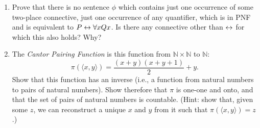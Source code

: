 {\begin{enumerate}
\begin{enumerate}
		\item Show that $\forall \upsilon \phi \wedge \forall \upsilon \psi \equiv \forall \upsilon \phi \wedge \forall \nu \psi[\nu/\upsilon]$ (and similarly for disjunction, and other combinations of universal and existential quantifiers).
		\item Show that for any elementary quantification $\phi'$ we can construct a logically equivalent sentence $\phi''$ in which any quantifier in $\phi'$ is brought to the front and has scope over the others. (Tip: remember to use the result proved in 12.(b).)
		\item Show, using these results, that there is a $\forall\exists$ sentence equivalent to any such monadic $\phi$.
	\end{enumerate}
\item Prove that there is no sentence $\phi$ which contains just one occurrence of some two-place connective, just one occurrence of any quantifier, which is in PNF and is equivalent to $P \leftrightarrow \forall x Qx$. Is there any connective other than $\leftrightarrow$ for which this also holds? Why?
\item The \emph{Cantor Pairing Function} is this function from $\mathbb{N}\times \mathbb{N}$ to $\mathbb{N}$: \begin{equation*}
	\pi(\langle x,y\rangle) = \dfrac{(x+y)(x+y+1)}{2}+y.
\end{equation*} Show that this function has an inverse (i.e., a function from natural numbers to pairs of natural numbers). Show therefore that $\pi$ is one-one and onto, and that the set of pairs of natural numbers is countable. (Hint: show that, given some $z$, we can reconstruct a unique $x$ and $y$ from it such that $\pi(\langle x,y\rangle)=z$.)
 \end{enumerate}

}

	


